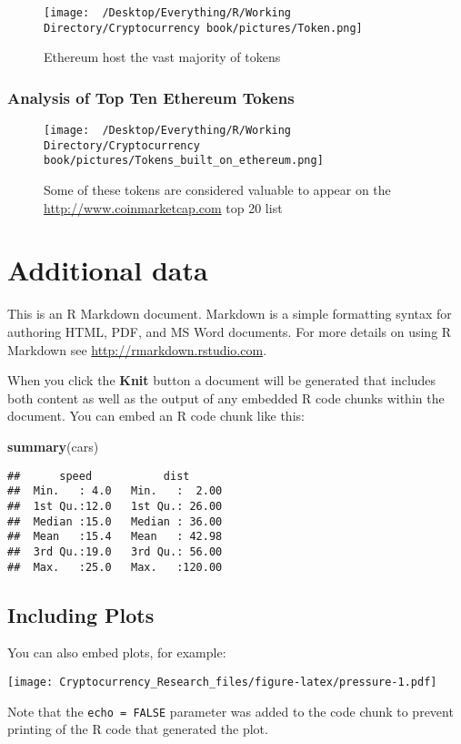 \documentclass[]{book}
\newenvironment{Shaded}{\begin{snugshade}}{\end{snugshade}}
\newcommand{\KeywordTok}[1]{\textcolor[rgb]{0.13,0.29,0.53}{\textbf{{#1}}}}
\newcommand{\NormalTok}[1]{{#1}}
\theoremstyle{definition}
\theoremstyle{definition}
\theoremstyle{definition}
\theoremstyle{remark}
\begin{document}
\begin{figure}[htbp]
\centering
\texttt{[image: ~/Desktop/Everything/R/Working Directory/Cryptocurrency book/pictures/Token.png]}
\caption{Ethereum host the vast majority of tokens}
\end{figure}

\subsection{Analysis of Top Ten Ethereum
Tokens}\label{analysis-of-top-ten-ethereum-tokens}

\begin{figure}[htbp]
\centering
\texttt{[image: ~/Desktop/Everything/R/Working Directory/Cryptocurrency book/pictures/Tokens\_built\_on\_ethereum.png]}
\caption{Some of these tokens are considered valuable to appear on the
\url{http://www.coinmarketcap.com} top 20 list}
\end{figure}

\chapter{Additional data}\label{additional-data}

This is an R Markdown document. Markdown is a simple formatting syntax
for authoring HTML, PDF, and MS Word documents. For more details on
using R Markdown see \url{http://rmarkdown.rstudio.com}.

When you click the \textbf{Knit} button a document will be generated
that includes both content as well as the output of any embedded R code
chunks within the document. You can embed an R code chunk like this:

\begin{Shaded}
\begin{Highlighting}[]
\KeywordTok{summary}\NormalTok{(cars)}
\end{Highlighting}
\end{Shaded}

\begin{verbatim}
##      speed           dist       
##  Min.   : 4.0   Min.   :  2.00  
##  1st Qu.:12.0   1st Qu.: 26.00  
##  Median :15.0   Median : 36.00  
##  Mean   :15.4   Mean   : 42.98  
##  3rd Qu.:19.0   3rd Qu.: 56.00  
##  Max.   :25.0   Max.   :120.00
\end{verbatim}

\section{Including Plots}\label{including-plots}

You can also embed plots, for example:

\texttt{[image: Cryptocurrency\_Research\_files/figure-latex/pressure-1.pdf]}

Note that the \texttt{echo\ =\ FALSE} parameter was added to the code
chunk to prevent printing of the R code that generated the plot.


\end{document}
